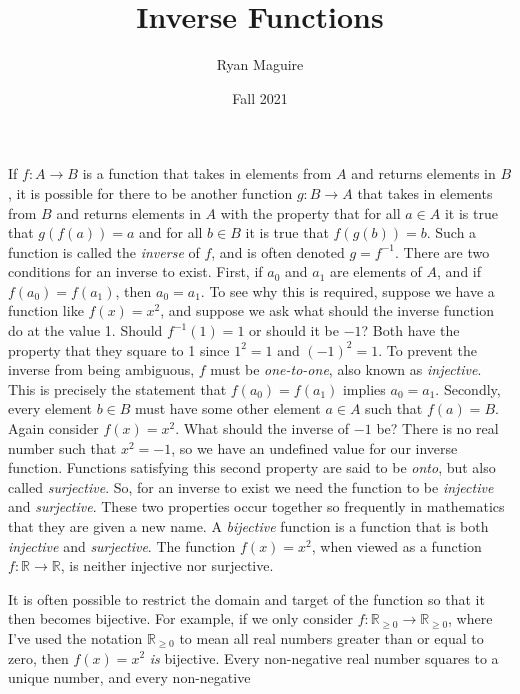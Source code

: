 \documentclass{article}
\title{Inverse Functions}
\author{Ryan Maguire}
\date{Fall 2021}
\begin{document}
    \maketitle
    If $f:A\rightarrow{B}$ is a function that takes in elements from $A$ and
    returns elements in $B$, it is possible for there to be another function
    $g:B\rightarrow{A}$ that takes in elements from $B$ and returns elements
    in $A$ with the property that for all $a\in{A}$ it is true that
    $g(f(a))=a$ and for all $b\in{B}$ it is true that $f(g(b))=b$. Such a
    function is called the \textit{inverse} of $f$, and is often denoted
    $g=f^{-1}$. There are two conditions for an inverse to exist. First,
    if $a_{0}$ and $a_{1}$ are elements of $A$, and if $f(a_{0})=f(a_{1})$,
    then $a_{0}=a_{1}$. To see why this is required, suppose we have a function
    like $f(x)=x^{2}$, and suppose we ask what should the inverse function do
    at the value 1. Should $f^{-1}(1)=1$ or should it be $-1$? Both have the
    property that they square to 1 since $1^{2}=1$ and $(-1)^{2}=1$. To
    prevent the inverse from being ambiguous, $f$ must be
    \textit{one-to-one}, also known as \textit{injective}. This is precisely
    the statement that $f(a_{0})=f(a_{1})$ implies $a_{0}=a_{1}$. Secondly,
    every element $b\in{B}$ must have some other element $a\in{A}$ such that
    $f(a)=B$. Again consider $f(x)=x^{2}$. What should the inverse of $-1$ be?
    There is no real number such that $x^{2}=-1$, so we have an undefined
    value for our inverse function. Functions satisfying this second property
    are said to be \textit{onto}, but also called \textit{surjective}. So, for
    an inverse to exist we need the function to be
    \textit{injective} and \textit{surjective}. These two properties occur
    together so frequently in mathematics that they are given a new name. A
    \textit{bijective} function is a function that is both \textit{injective}
    and \textit{surjective}. The function $f(x)=x^{2}$, when viewed as a
    function $f:\mathbb{R}\rightarrow\mathbb{R}$, is neither injective nor
    surjective.
    \par\hfill\par
    It is often possible to restrict the domain and target of the function
    so that it then becomes bijective. For example, if we only consider
    $f:\mathbb{R}_{\geq{0}}\rightarrow\mathbb{R}_{\geq{0}}$, where I've used
    the notation $\mathbb{R}_{\geq{0}}$ to mean all real numbers greater than
    or equal to zero, then $f(x)=x^{2}$ \textit{is} bijective. Every
    non-negative real number squares to a unique number, and every non-negative
\end{document}
